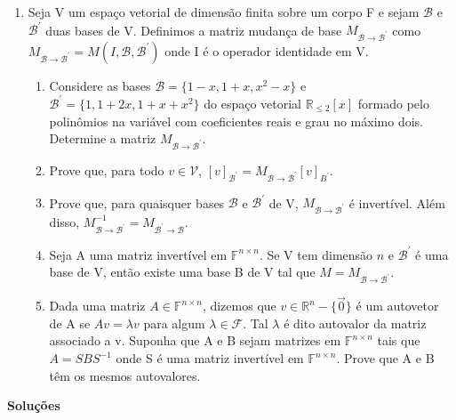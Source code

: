 \documentclass[12pt]{article}
\begin{document}
\begin{enumerate}
    \item Seja V um espaço vetorial de dimensão finita sobre um corpo F e sejam $\mathcal{B}$ e $\mathcal{B}^{\prime}$ duas bases de V. Definimos a matriz mudança de base $M_{\mathcal{B}\rightarrow\mathcal{B^{\prime}}}$ como $M_{\mathcal{B}\rightarrow\mathcal{B^{\prime}}} = M(I,\mathcal{B},\mathcal{B}^{\prime})$ onde I é o operador identidade em V.
    \begin{enumerate}
        \item Considere as bases $\mathcal{B}=\{1-x, 1+x, x^{2}-x\}$ e $\mathcal{B}^{\prime}=\{1, 1+2x, 1+x+x^{2}\}$ do espaço vetorial $\mathbb{R}_{\le2}[x]$ formado pelo polinômios na variável com coeficientes reais e grau no máximo dois. Determine a matriz $M_{\mathcal{B}\rightarrow\mathcal{B^{\prime}}}$.
        \item Prove que, para todo $v \in \mathcal{V}$, $[v]_{\mathcal{B}^{\prime}} = M_{\mathcal{B}\rightarrow\mathcal{B}^{\prime}}[v]_{B^{\prime}}$.
        \item Prove que, para quaisquer bases $\mathcal{B}$ e $\mathcal{B}^{\prime}$ de V, $M_{\mathcal{B}\rightarrow\mathcal{B^{\prime}}}$ é invertível. Além disso, $M_{\mathcal{B}\rightarrow\mathcal{B^{\prime}}}^{-1} = M_{\mathcal{B^{\prime}}\rightarrow\mathcal{B}}$.
        \item Seja A uma matriz invertível em $\mathbb{F}^{n\times n}$. Se V tem dimensão $n$ e $\mathcal{B}^{\prime}$ é uma base de V, então existe uma base B de V tal que $M=M_{\mathcal{B}\rightarrow\mathcal{B^{\prime}}}$.
        \item Dada uma matriz $A \in \mathbb{F}^{n\times n}$, dizemos que $v \in \mathbb{R}^{n}-\{\vec{0}\}$ é um autovetor de A se $Av=\lambda v$ para algum $\lambda \in \mathcal{F}$. Tal $\lambda$ é dito autovalor da matriz associado a v. Suponha que A e B sejam matrizes em $\mathbb{F}^{n\times n}$ tais que $A=SBS^{-1}$ onde S é uma matriz invertível em $\mathbb{F}^{n\times n}$. Prove que A e B têm os mesmos autovalores.
    \end{enumerate}

\end{enumerate}

\begin{center}
    \textbf{Soluções}
\end{center}
\end{document}
